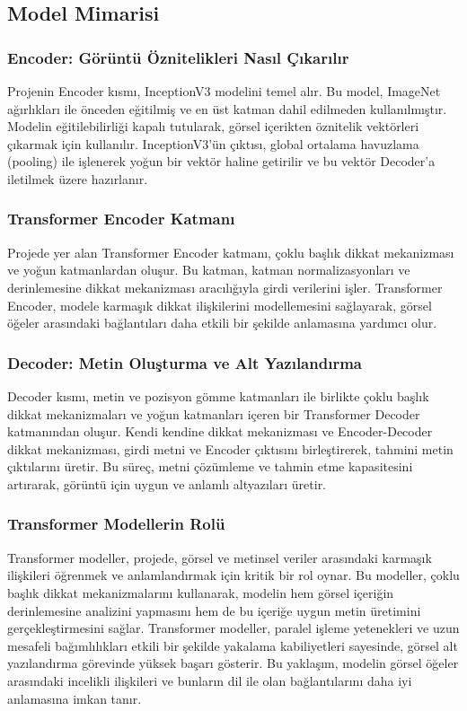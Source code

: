 \documentclass{article}
\begin{document}
\subsection{Model Mimarisi}

\subsubsection{Encoder: Görüntü Öznitelikleri Nasıl Çıkarılır}
Projenin Encoder kısmı, InceptionV3 modelini temel alır. Bu model, ImageNet ağırlıkları ile önceden eğitilmiş ve en üst katman dahil edilmeden kullanılmıştır. Modelin eğitilebilirliği kapalı tutularak, görsel içerikten öznitelik vektörleri çıkarmak için kullanılır. InceptionV3'ün çıktısı, global ortalama havuzlama (pooling) ile işlenerek yoğun bir vektör haline getirilir ve bu vektör Decoder'a iletilmek üzere hazırlanır.

\subsubsection{Transformer Encoder Katmanı}
Projede yer alan Transformer Encoder katmanı, çoklu başlık dikkat mekanizması ve yoğun katmanlardan oluşur. Bu katman, katman normalizasyonları ve derinlemesine dikkat mekanizması aracılığıyla girdi verilerini işler. Transformer Encoder, modele karmaşık dikkat ilişkilerini modellemesini sağlayarak, görsel öğeler arasındaki bağlantıları daha etkili bir şekilde anlamasına yardımcı olur.

\subsubsection{Decoder: Metin Oluşturma ve Alt Yazılandırma}
Decoder kısmı, metin ve pozisyon gömme katmanları ile birlikte çoklu başlık dikkat mekanizmaları ve yoğun katmanları içeren bir Transformer Decoder katmanından oluşur. Kendi kendine dikkat mekanizması ve Encoder-Decoder dikkat mekanizması, girdi metni ve Encoder çıktısını birleştirerek, tahmini metin çıktılarını üretir. Bu süreç, metni çözümleme ve tahmin etme kapasitesini artırarak, görüntü için uygun ve anlamlı altyazıları üretir.
\subsubsection{Transformer Modellerin Rolü}
Transformer modeller, projede, görsel ve metinsel veriler arasındaki karmaşık ilişkileri öğrenmek ve anlamlandırmak için kritik bir rol oynar. Bu modeller, çoklu başlık dikkat mekanizmalarını kullanarak, modelin hem görsel içeriğin derinlemesine analizini yapmasını hem de bu içeriğe uygun metin üretimini gerçekleştirmesini sağlar. Transformer modeller, paralel işleme yetenekleri ve uzun mesafeli bağımlılıkları etkili bir şekilde yakalama kabiliyetleri sayesinde, görsel alt yazılandırma görevinde yüksek başarı gösterir. Bu yaklaşım, modelin görsel öğeler arasındaki incelikli ilişkileri ve bunların dil ile olan bağlantılarını daha iyi anlamasına imkan tanır.
\end{document}
